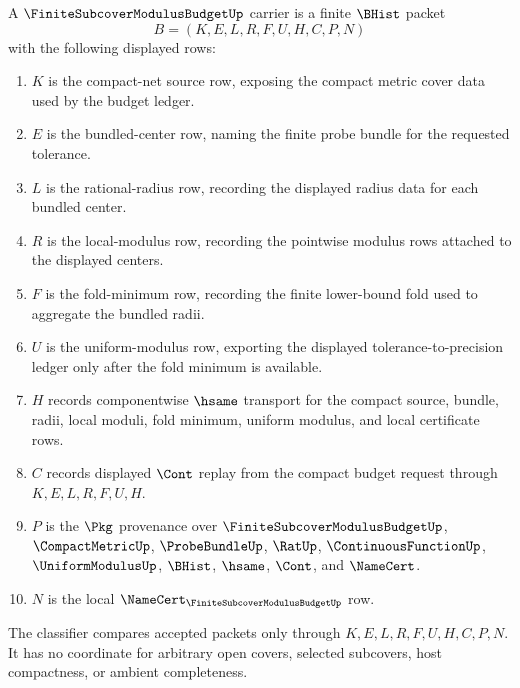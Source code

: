 \begin{definition}
\label{def:finite-subcover-modulus-budget-carrier}
A $\FiniteSubcoverModulusBudgetUp$ carrier is a finite $\BHist$ packet
$$
B=(K,E,L,R,F,U,H,C,P,N)
$$
with the following displayed rows:
\begin{enumerate}
\item $K$ is the compact-net source row, exposing the compact metric cover data used by the budget ledger.
\item $E$ is the bundled-center row, naming the finite probe bundle for the requested tolerance.
\item $L$ is the rational-radius row, recording the displayed radius data for each bundled center.
\item $R$ is the local-modulus row, recording the pointwise modulus rows attached to the displayed centers.
\item $F$ is the fold-minimum row, recording the finite lower-bound fold used to aggregate the bundled radii.
\item $U$ is the uniform-modulus row, exporting the displayed tolerance-to-precision ledger only after the fold minimum is available.
\item $H$ records componentwise $\hsame$ transport for the compact source, bundle, radii, local moduli, fold minimum, uniform modulus, and local certificate rows.
\item $C$ records displayed $\Cont$ replay from the compact budget request through $K,E,L,R,F,U,H$.
\item $P$ is the $\Pkg$ provenance over $\FiniteSubcoverModulusBudgetUp$, $\CompactMetricUp$, $\ProbeBundleUp$, $\RatUp$, $\ContinuousFunctionUp$, $\UniformModulusUp$, $\BHist$, $\hsame$, $\Cont$, and $\NameCert$.
\item $N$ is the local $\NameCert_{\FiniteSubcoverModulusBudgetUp}$ row.
\end{enumerate}
The classifier compares accepted packets only through $K,E,L,R,F,U,H,C,P,N$. It has no coordinate for arbitrary open covers, selected subcovers, host compactness, or ambient completeness.
\end{definition}

